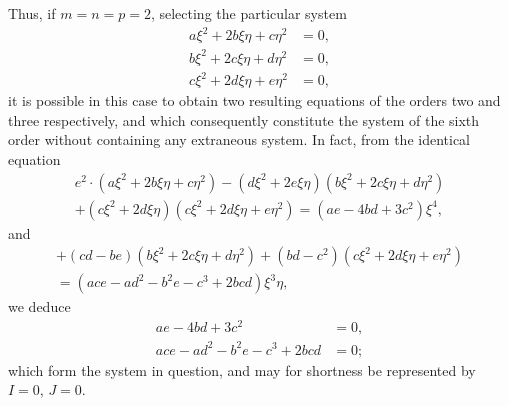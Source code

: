 \documentclass[11pt,a4paper]{article}
\theoremstyle{definition}
\begin{document}
Thus, if $m = n = p = 2$, selecting the particular system
\begin{align*}
a\xi^{2} + 2b\xi\eta + c\eta^{2} &= 0, \\
b\xi^{2} + 2c\xi\eta + d\eta^{2} &= 0, \\
c\xi^{2} + 2d\xi\eta + e\eta^{2} &= 0,
\end{align*}
it is possible in this case to obtain two resulting equations of the orders two and three respectively, and which consequently constitute the system of the sixth order without containing any extraneous system. In fact, from the identical equation
\begin{multline*}
e^{2} \cdot (a\xi^{2} + 2b\xi\eta + c\eta^{2}) - (d\xi^{2} + 2e\xi\eta)(b\xi^{2} + 2c\xi\eta + d\eta^{2}) \\
+ (c\xi^{2} + 2d\xi\eta)(c\xi^{2} + 2d\xi\eta + e\eta^{2}) = (ae - 4bd + 3c^{2})\xi^{4},
\end{multline*}
and
\begin{multline*}
+(cd - be)(b\xi^{2} + 2c\xi\eta + d\eta^{2}) + (bd - c^{2})(c\xi^{2} + 2d\xi\eta + e\eta^{2}) \\
= (ace - ad^{2} - b^{2}e - c^{3} + 2bcd)\xi^{3}\eta,
\end{multline*}
we deduce
\begin{align*}
ae - 4bd + 3c^{2} &= 0, \\
ace - ad^{2} - b^{2}e - c^{3} + 2bcd &= 0;
\end{align*}
which form the system in question, and may for shortness be represented by $I = 0$, $J = 0$.
\end{document}

